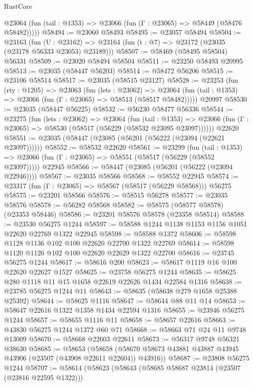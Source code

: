 \begin{lexlean}{RustCore}
\begin{coremodule}
      @23064 (fun (tail : @1353) => @23066 (fun (Γ : @23065) => @58449 (@58476 @58482)))))
@58494 := @23060 @58493
@58495 := @23057 @58494
@58504 := @23163
    (fun (U : @23162) => @23164 (fun (t : @7) => @23172 (@23035 (@23178 @56333 @23053) @23189)))
@58507 := @58469 (@58495 @58504) @56331
@58509 := @23020 @58494 @58504
@58511 := @23250 @58493 @20995
@58513 := @23035 (@58447 @56203)
@58514 := @58472 @56206
@58515 := @23106 @58514
@58517 := @23035 (@58515 @23127)
@58528 := @23253
    (fun (rty : @1205) =>
    @23063
      (fun (lets : @23062) =>
      @23064 (fun (tail : @1353) => @23066 (fun (Γ : @23065) => @58513 (@58517 @58482)))))
    @20997
@58530 := @23035 (@58447 @56225)
@58532 := @56230 @58477 @56336
@58544 := @23275
    (fun (lets : @23062) =>
    @23064
      (fun (tail : @1353) =>
      @23066 (fun (Γ : @23065) => @58530 (@58517 (@56229 (@58532 @23095 @23097))))))
    @22620
@58551 := @23035 (@58447 (@23085 (@56201 (@56222 (@23094 (@22621 @23097))))))
@58552 := @58532 @22620
@58561 := @23299
    (fun (tail : @1353) => @23066 (fun (Γ : @23065) => @58551 (@58517 (@56229 (@58552 @23097)))))
    @22945
@58566 := @58447 (@23085 (@56201 (@56222 (@23094 @22946))))
@58567 := @23035 @58566
@58568 := @58552 @22945
@58574 := @23317 (fun (Γ : @23065) => @58567 (@58517 (@56229 @58568))) @56275
@58575 := @23201 @58566
@58576 := @58515 @56278
@58577 := @23035 @58576
@58578 := @56282 @58568
@58582 := @58575 (@58577 @58578) (@23353 @58446)
@58586 := @23201 @58576 @58578 (@23358 @58514)
@58588 := @23530 @56275 @1244
@58597 := @58588 @1244 @1138 @1153 @1156 @1051 @22620 @22769 @1322 @22945
@58598 := @58588 @1372
@58606 := @58598 @1128 @1136 @102 @100 @22620 @22700 @1322 @22769
@58614 := @58598 @1120 @1126 @102 @100 @22620 @22629 @1322 @22700
@58616 := @23745 @56275 @1244
@58617 := @58616 @200
@58623 := @58617 @1119 @16 @100 @22620 @22627 @1527
@58625 := @23758 @56275 @1244
@58635 := @58625 @280 @1118 @11 @15 @1658 @22619 @22626 @1434 @22584 @1316
@58638 := @23785 @56275 @1244 @11
@58643 := @58635 (@58638 @279 @1658 @25388 @25392)
@58644 := @58625 @1116
@58647 := @58644 @88 @11 @14
@58653 := @58647 @22616 @1322 @1358 @1434 @22594 @1316
@58655 := @23946 @56275 @1244
@58657 := @58655 @1116 @11
@58658 := @58657 @22616
@58663 := @43830 @56275 @1244 @1372 @60 @71
@58668 := @58663 @71 @24 @11 @9748 @13009
@58670 := @58668 @22603 @22611
@58673 := @56317 @9748 @56321 @38630
@58685 := @58653
    (@58658 (@58670 @58673 @43881 @43887 @43945 @43906 (@23507 (@43908 @22611 @22604)) @43916))
@58687 := @23808 @56275 @1244
@58707 := @58614
    (@58623
      (@58643
        (@58685 @58687 @23814 (@23507 (@23816 @22595 @1322)))

\end{coremodule}
\end{lexlean}
